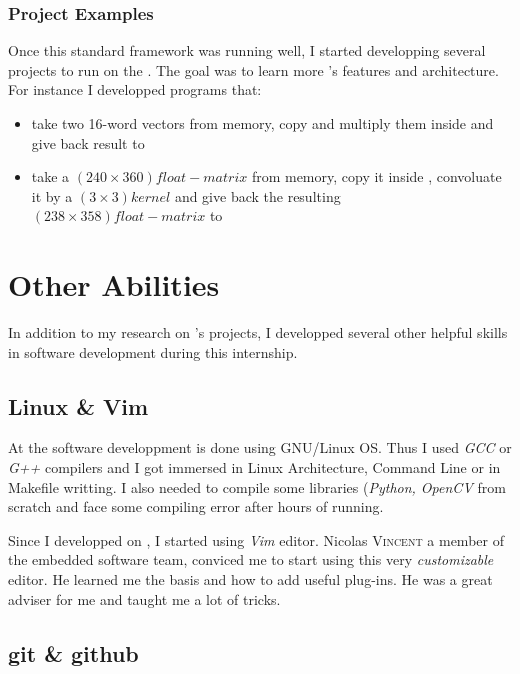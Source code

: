 \subsubsection{Project Examples}

Once this standard framework was running well, I started developping several projects to run on the \rasp. The goal was to learn more \vc{}'s features and architecture. For instance I developped programs that:
\begin{itemize}
	\item take two 16-word vectors from \cpu{} memory, copy and multiply them inside \ram{} and give back result to \cpu
	\item take a $(240\times 360)float-matrix$ from \cpu{} memory, copy it inside \ram{}, convoluate it by a $(3\times 3)kernel$ and give back the resulting $(238\times 358)float-matrix$ to \cpu
\end{itemize}
\newpage


\section{Other Abilities}\label{FillingFile}

In addition to my research on \vc{}'s projects, I developped several other helpful skills in software development during this internship.


\subsection{Linux \& Vim}

At \groupname{} the software developpment is done using GNU/Linux OS. Thus I used \emph{GCC} or \emph{G++} compilers and I got immersed in Linux Architecture, Command Line or in Makefile writting. I also needed to compile some libraries (\emph{Python, OpenCV} from scratch and face some compiling error after hours of running.

Since I developped on \rasp{}, I started using \emph{Vim} editor. Nicolas \textsc{Vincent} a member of the embedded software team, conviced me to start using this very \emph{customizable} editor. He learned me the basis and how to add useful plug-ins. He was a great adviser for me and taught me a lot of tricks.


\subsection{git \& github}

